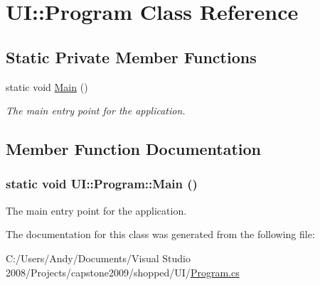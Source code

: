 \hypertarget{class_u_i_1_1_program}{
\section{UI::Program Class Reference}
\label{class_u_i_1_1_program}
}
\subsection*{Static Private Member Functions}
\begin{DoxyCompactItemize}
\item 
static void \hyperlink{class_u_i_1_1_program_a96adc9ed81265ed0455a6618d744ec8c}{Main} ()
\begin{DoxyCompactList}\small\item\em The main entry point for the application. \item\end{DoxyCompactList}\end{DoxyCompactItemize}


\subsection{Member Function Documentation}
\hypertarget{class_u_i_1_1_program_a96adc9ed81265ed0455a6618d744ec8c}{
\subsubsection[{Main}]{\setlength{\rightskip}{0pt plus 5cm}static void UI::Program::Main ()}}
\label{class_u_i_1_1_program_a96adc9ed81265ed0455a6618d744ec8c}


The main entry point for the application. 

The documentation for this class was generated from the following file:\begin{DoxyCompactItemize}
\item 
C:/Users/Andy/Documents/Visual Studio 2008/Projects/capstone2009/shopped/UI/\hyperlink{_program_8cs}{Program.cs}\end{DoxyCompactItemize}
